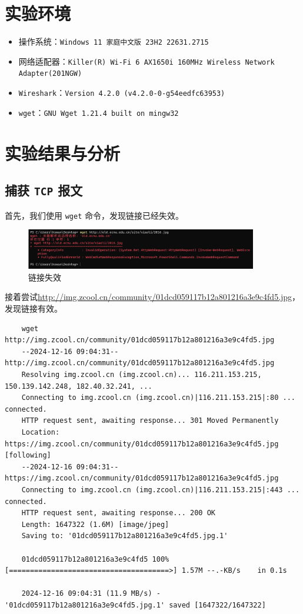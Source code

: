 \documentclass{article}
\begin{document}
\section{实验环境}


\begin{itemize}[noitemsep]
  \item 操作系统：\texttt{Windows 11 家庭中文版 23H2 22631.2715}
  \item 网络适配器：\texttt{Killer(R) Wi-Fi 6 AX1650i 160MHz Wireless Network Adapter(201NGW)}
  \item \texttt{Wireshark}：\texttt{Version 4.2.0 (v4.2.0-0-g54eedfc63953)}
  \item \texttt{wget}：\texttt{GNU Wget 1.21.4 built on mingw32}
\end{itemize}


\section{实验结果与分析}

\subsection{捕获 \texttt{TCP} 报文}

首先，我们使用 \texttt{wget} 命令，发现链接已经失效。

\begin{figure}[H]
  \centering
  \includegraphics[width=0.9\textwidth]{img/1.png}
  \caption{链接失效}
\end{figure}

接着尝试\url{http://img.zcool.cn/community/01dcd059117b12a801216a3e9c4fd5.jpg}，发现链接有效。

\begin{lstlisting}
	wget http://img.zcool.cn/community/01dcd059117b12a801216a3e9c4fd5.jpg
	--2024-12-16 09:04:31--  http://img.zcool.cn/community/01dcd059117b12a801216a3e9c4fd5.jpg
	Resolving img.zcool.cn (img.zcool.cn)... 116.211.153.215, 150.139.142.248, 182.40.32.241, ...
	Connecting to img.zcool.cn (img.zcool.cn)|116.211.153.215|:80 ... connected.
	HTTP request sent, awaiting response... 301 Moved Permanently
	Location: https://img.zcool.cn/community/01dcd059117b12a801216a3e9c4fd5.jpg [following]
	--2024-12-16 09:04:31--  https://img.zcool.cn/community/01dcd059117b12a801216a3e9c4fd5.jpg
	Connecting to img.zcool.cn (img.zcool.cn)|116.211.153.215|:443 ... connected.
	HTTP request sent, awaiting response... 200 OK
	Length: 1647322 (1.6M) [image/jpeg]
	Saving to: '01dcd059117b12a801216a3e9c4fd5.jpg.1'
	
	01dcd059117b12a801216a3e9c4fd5 100%[======================================>] 1.57M --.-KB/s    in 0.1s
	
	2024-12-16 09:04:31 (11.9 MB/s) - '01dcd059117b12a801216a3e9c4fd5.jpg.1' saved [1647322/1647322]
\end{lstlisting}
\end{document}

